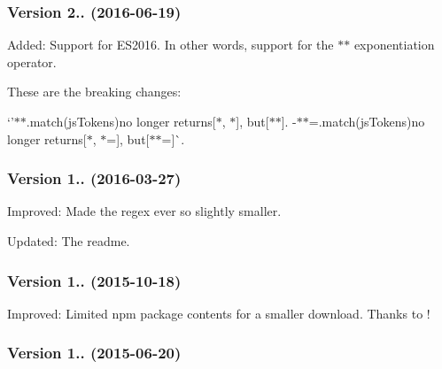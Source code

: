 \subsubsection*{Version 2.. (2016-\/06-\/19)}


\begin{DoxyItemize}
\item Added\+: Support for E\+S2016. In other words, support for the {\ttfamily $\ast$$\ast$} exponentiation operator.
\end{DoxyItemize}

These are the breaking changes\+:


\begin{DoxyItemize}
\item `'$\ast$$\ast$\textquotesingle{}.match(js\+Tokens){\ttfamily no longer returns}\mbox{[}\textquotesingle{}$\ast$\textquotesingle{}, \textquotesingle{}$\ast$\textquotesingle{}\mbox{]}{\ttfamily , but}\mbox{[}\textquotesingle{}$\ast$$\ast$\textquotesingle{}\mbox{]}{\ttfamily . -\/}\textquotesingle{}$\ast$$\ast$=\textquotesingle{}.match(js\+Tokens){\ttfamily no longer returns}\mbox{[}\textquotesingle{}$\ast$\textquotesingle{}, \textquotesingle{}$\ast$=\textquotesingle{}\mbox{]}{\ttfamily , but}\mbox{[}\textquotesingle{}$\ast$$\ast$=\textquotesingle{}\mbox{]}\`{}.
\end{DoxyItemize}

\subsubsection*{Version 1.. (2016-\/03-\/27)}


\begin{DoxyItemize}
\item Improved\+: Made the regex ever so slightly smaller.
\item Updated\+: The readme.
\end{DoxyItemize}

\subsubsection*{Version 1.. (2015-\/10-\/18)}


\begin{DoxyItemize}
\item Improved\+: Limited npm package contents for a smaller download. Thanks to !
\end{DoxyItemize}

\subsubsection*{Version 1.. (2015-\/06-\/20)}


